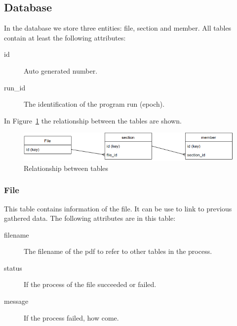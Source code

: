 \documentclass{ou-report}
\begin{document}
\subsection{Database}
In the database we store three entities: file, section and member. All tables 
contain at least the following attributes:
\begin{description}
    \item[id] Auto generated number.
    \item[run\_id] The identification of the program run (epoch).
\end{description}
In Figure~\ref{fig:lncs_pdf_database} the relationship between the tables are
shown.
\begin{figure}[H]
    \centering
    \includegraphics[width=12cm]{images/lncs_pdf_parser_tool.drawio.png}
    \caption{Relationship between tables}
    \label{fig:lncs_pdf_database}
\end{figure}

\subsubsection{File}
This table contains information of the file. It can be use to link to previous 
gathered data. The following attributes are in this table:
\begin{description}
    \item[filename] The filename of the pdf to refer to other tables in the 
        process.
    \item[status] If the process of the file succeeded or failed.
    \item[message] If the process failed, how come. 
\end{description}
\end{document}
